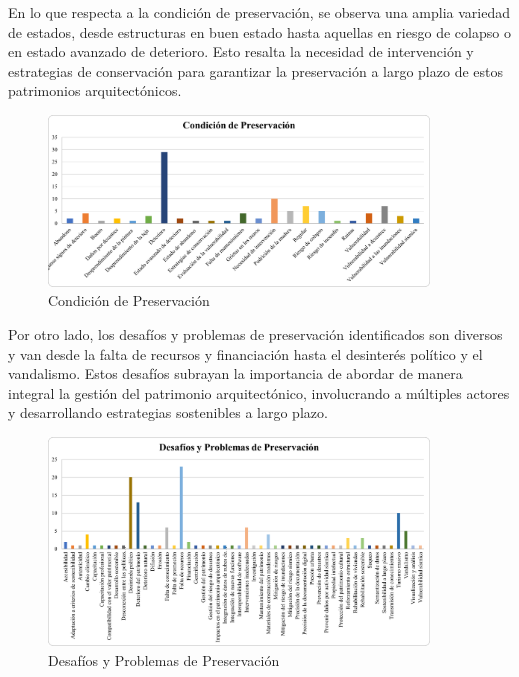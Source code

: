 \documentclass[journal,article,submit,pdftex,moreauthors]{Definitions/mdpi}
\begin{document}
En lo que respecta a la condición de preservación, se observa una amplia variedad de estados, desde estructuras en buen estado hasta aquellas en riesgo de colapso o en estado avanzado de deterioro. Esto resalta la necesidad de intervención y estrategias de conservación para garantizar la preservación a largo plazo de estos patrimonios arquitectónicos.
 \par %
  \begin{figure} [h!]
    \centering
    \includegraphics[width=0.9\textwidth]{Graficos/Condición de Preservación.png }
    \caption{Condición de Preservación}
    \label{fig:grafico}
\end{figure}
\par %
Por otro lado, los desafíos y problemas de preservación identificados son diversos y van desde la falta de recursos y financiación hasta el desinterés político y el vandalismo. Estos desafíos subrayan la importancia de abordar de manera integral la gestión del patrimonio arquitectónico, involucrando a múltiples actores y desarrollando estrategias sostenibles a largo plazo.
 \par %
  \begin{figure} [h!]
    \centering
    \includegraphics[width=0.9\textwidth]{Graficos/Desafíos y Problemas de Preservación.png }
    \caption{Desafíos y Problemas de Preservación}
    \label{fig:grafico}
\end{figure}
\par %
 
\end{document}
